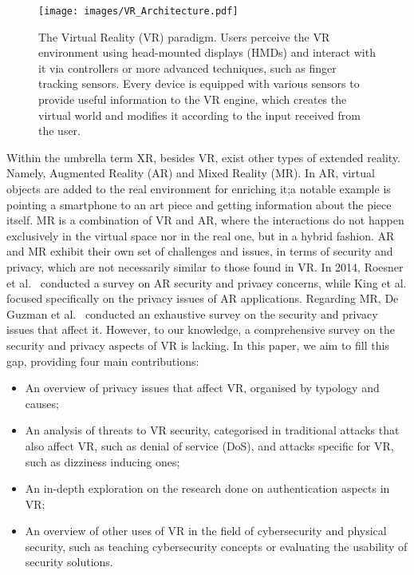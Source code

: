 \documentclass[journal]{IEEEtran}
\begin{document}
\begin{figure*}[t]
	\center
	\texttt{[image: images/VR\_Architecture.pdf]}
	\caption{The Virtual Reality (VR) paradigm. Users perceive the VR environment using head-mounted displays (HMDs) and interact with it via controllers or more advanced techniques, such as finger tracking sensors. Every device is equipped with various sensors to provide useful information to the VR engine, which creates the virtual world and modifies it according to the input received from the user.}
	\label{fig:vr}
\end{figure*}

Within the umbrella term XR, besides VR, exist other types of extended reality. Namely, Augmented Reality (AR) and Mixed Reality (MR). In AR, virtual objects are added to the real environment for enriching it;a notable example is pointing a smartphone to an art piece and getting information about the piece itself. MR is a combination of VR and AR, where the interactions do not happen exclusively in the virtual space nor in the real one, but in a hybrid fashion. AR and MR exhibit their own set of challenges and issues, in terms of security and privacy, which are not necessarily similar to those found in VR. In 2014, Roesner et al.~\cite{roesner2014} conducted a survey on AR security and privacy concerns, while King et al.\cite{king2020} focused specifically on the privacy issues of AR applications. Regarding MR, De Guzman et al.~\cite{deguzman2019} conducted an exhaustive survey on the security and privacy issues that affect it. However, to our knowledge, a comprehensive survey on the security and privacy aspects of VR is lacking. In this paper, we aim to fill this gap, providing four main contributions:
\begin{itemize}
    \item An overview of privacy issues that affect VR, organised by typology and causes;
    \item An analysis of threats to VR security, categorised in traditional attacks that also affect VR, such as denial of service (DoS), and attacks specific for VR, such as dizziness inducing ones;
    \item An in-depth exploration on the research done on authentication aspects in VR;
    \item An overview of other uses of VR in the field of cybersecurity and physical security, such as teaching cybersecurity concepts or evaluating the usability of security solutions.
\end{itemize}
\end{document}

